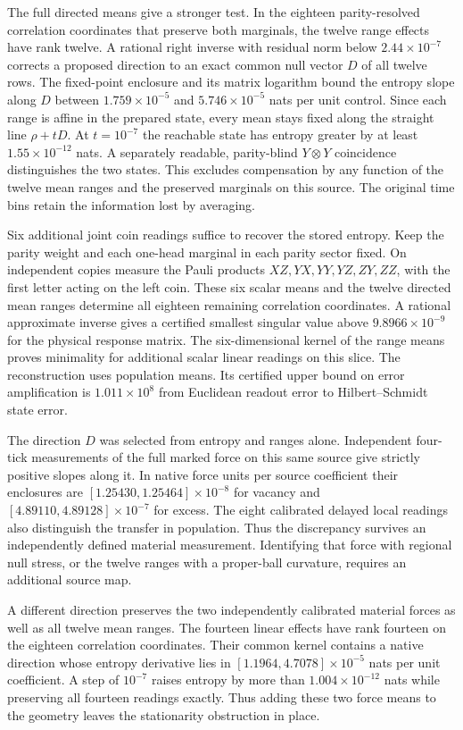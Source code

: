 \documentclass[11pt]{article}
\begin{document}
The full directed means give a stronger test. In the eighteen
parity-resolved correlation coordinates that preserve both marginals,
the twelve range effects have rank twelve. A rational right inverse
with residual norm below $2.44\times10^{-7}$ corrects a proposed
direction to an exact common null vector $D$ of all twelve rows.
The fixed-point enclosure and its matrix logarithm bound the entropy
slope along $D$ between $1.759\times10^{-5}$ and $5.746\times10^{-5}$
nats per unit control. Since each range is affine in the prepared
state, every mean stays fixed along the straight line $\rho+tD$.
At $t=10^{-7}$ the reachable state has entropy greater by at least
$1.55\times10^{-12}$ nats. A separately readable, parity-blind
$Y\otimes Y$ coincidence distinguishes the two states. This
excludes compensation by any function of the twelve mean ranges
and the preserved marginals on this source. The original time bins retain the information lost by averaging.

Six additional joint coin readings suffice to recover the stored
entropy. Keep the parity weight and each one-head marginal in each
parity sector fixed. On independent copies measure the Pauli products
$XZ,YX,YY,YZ,ZY,ZZ$, with the first letter acting on the left coin.
These six scalar means and the twelve directed mean ranges determine
all eighteen remaining correlation coordinates. A rational approximate
inverse gives a certified smallest singular value above
$9.8966\times 10^{-9}$ for the physical response matrix.
The six-dimensional kernel of the range means proves minimality for
additional scalar linear readings on this slice. The reconstruction
uses population means. Its certified upper bound on error amplification
is $1.011\times10^8$ from Euclidean readout error to
Hilbert--Schmidt state error.

The direction $D$ was selected from entropy and ranges alone.
Independent four-tick measurements of the full marked force on this
same source give strictly positive slopes along it. In native force
units per source coefficient their enclosures are
$[1.25430,1.25464]\times10^{-8}$ for vacancy and
$[4.89110,4.89128]\times10^{-7}$ for excess. The eight calibrated
delayed local readings also distinguish the transfer in population.
Thus the discrepancy survives an independently defined material
measurement. Identifying that force with regional null stress,
or the twelve ranges with a proper-ball curvature, requires an
additional source map.

A different direction preserves the two independently calibrated material
forces as well as all twelve mean ranges. The fourteen linear effects
have rank fourteen on the eighteen correlation coordinates. Their
common kernel contains a native direction whose entropy derivative
lies in $[1.1964,4.7078]\times10^{-5}$ nats per unit coefficient.
A step of $10^{-7}$ raises entropy by more than $1.004\times10^{-12}$
nats while preserving all fourteen readings exactly. Thus adding
these two force means to the geometry leaves the stationarity
obstruction in place.
\end{document}
